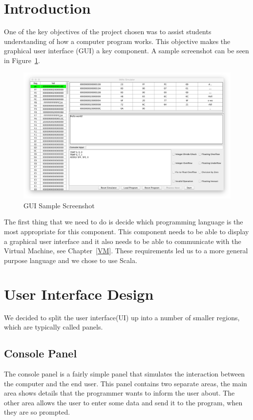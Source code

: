 \documentclass[a4paper,11pt]{report}
\begin{document}
\section{Introduction}
One of the key objectives of the project chosen was to assist students understanding of how a computer program works. This objective makes the graphical user interface (GUI) a key component. A sample screenshot can be seen in Figure~\ref{screenshot}.
\begin{figure}[ht!]
\centering
\includegraphics[width=\textwidth]{GUISample2}
\caption{GUI Sample Screenshot}
\label{screenshot}
\end{figure}

The first thing that we need to do is decide which programming language is the most appropriate for this component. This component needs to be able to display a graphical user interface and it also needs to be able to communicate with the Virtual Machine, see Chapter~\ref{VM}. These requirements led us to a more general purpose language and we chose to use Scala.
\section{User Interface Design}
We decided to split the user interface(UI) up into a number of smaller regions, which are typically called panels. 
\subsection{Console Panel}
The console panel is a fairly simple panel that simulates the interaction between the computer and the end user. This panel contains two separate areas, the main area shows details that the programmer wants to inform the user about. The other area allows the user to enter some data and send it to the program, when they are so prompted.
\end{document}
